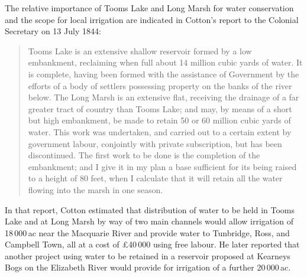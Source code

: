 The relative importance of Tooms Lake and Long Marsh for water
conservation and the scope for local irrigation are indicated in
Cotton's report to the Colonial Secretary on 13 July 1844:
\begin{quote}
	Tooms Lake is an extensive shallow reservoir formed by a low
	embankment, reclaiming when full about 14 million cubic yards
	of water.  It is complete, having been formed with the
	assistance of Government by the efforts of a body of settlers
	possessing property on the banks of the river below.  The Long
	Marsh is an extensive flat, receiving the drainage of a far
	greater tract of country than Tooms Lake; and may, by means of
	a short but high embankment, be made to retain 50 or 60
	million cubic yards of water. This work was undertaken, and
	carried out to a certain extent by government labour,
	conjointly with private subscription, but has been
	discontinued.  The first work to be done is the completion of
	the embankment; and I give it in my plan a base sufficient for
	its being raised to a height of 80 feet, when I calculate that
	it will retain all the water flowing into the marsh in one
	season.
\end{quote}

In that report, Cotton estimated that distribution of water to be held
in Tooms Lake and at Long Marsh by way of two main channels would
allow irrigation of 18\,000\,ac near the Macquarie River and provide
water to Tunbridge,  Ross,  and Campbell
Town,  all at a cost of
\pounds40\,000 using free labour.  He later reported that another project
using water to be retained in a reservoir proposed at Kearneys Bogs
 on
the Elizabeth River  would provide for
irrigation of a further 20\,000\,ac.

